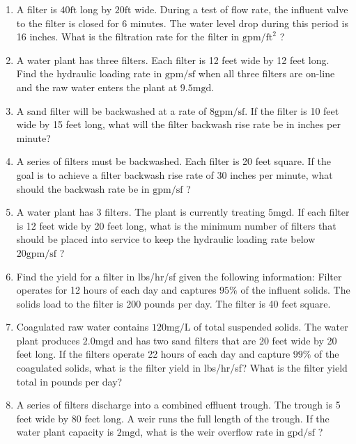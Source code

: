 \documentclass[10pt]{article}
\begin{document}
\begin{enumerate}
\begin{enumerate}
\begin{enumerate}
  \item A filter is $40 \mathrm{ft}$ long by $20 \mathrm{ft}$ wide. During a test of flow rate, the influent valve to the filter is closed for 6 minutes. The water level drop during this period is 16 inches. What is the filtration rate for the filter in $\mathrm{gpm} / \mathrm{ft}^{2}$ ?

  \item A water plant has three filters. Each filter is 12 feet wide by 12 feet long. Find the hydraulic loading rate in $\mathrm{gpm} / \mathrm{sf}$ when all three filters are on-line and the raw water enters the plant at $9.5 \mathrm{mgd}$.

  \item A sand filter will be backwashed at a rate of $8 \mathrm{gpm} / \mathrm{sf}$. If the filter is 10 feet wide by 15 feet long, what will the filter backwash rise rate be in inches per minute?

  \item A series of filters must be backwashed. Each filter is 20 feet square. If the goal is to achieve a filter backwash rise rate of 30 inches per minute, what should the backwash rate be in $\mathrm{gpm} / \mathrm{sf}$ ?

  \item A water plant has 3 filters. The plant is currently treating $5 \mathrm{mgd}$. If each filter is 12 feet wide by 20 feet long, what is the minimum number of filters that should be placed into service to keep the hydraulic loading rate below $20 \mathrm{gpm} / \mathrm{sf}$ ?

  \item Find the yield for a filter in lbs/hr/sf given the following information: Filter operates for 12 hours of each day and captures $95 \%$ of the influent solids. The solids load to the filter is 200 pounds per day. The filter is 40 feet square.

  \item Coagulated raw water contains $120 \mathrm{mg} / \mathrm{L}$ of total suspended solids. The water plant produces $2.0 \mathrm{mgd}$ and has two sand filters that are 20 feet wide by 20 feet long. If the filters operate 22 hours of each day and capture $99 \%$ of the coagulated solids, what is the filter yield in lbs/hr/sf? What is the filter yield total in pounds per day?

  \item A series of filters discharge into a combined effluent trough. The trough is 5 feet wide by 80 feet long. A weir runs the full length of the trough. If the water plant capacity is $2 \mathrm{mgd}$, what is the weir overflow rate in $\mathrm{gpd} / \mathrm{sf}$ ?


\end{enumerate}
\end{enumerate}
\end{enumerate}
\end{document}
